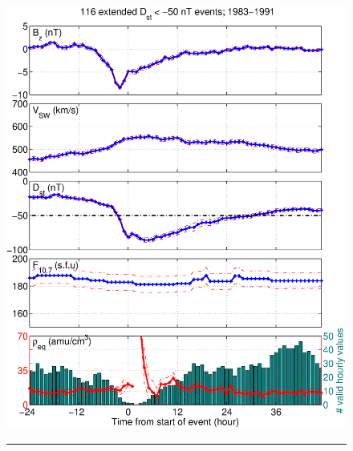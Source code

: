 \documentclass[12pt]{article}
\begin{document}
\begin{figure}[h]
	\end{figure}
	
	\clearpage
	
	\begin{figure}[tp!]
		\centering
		\includegraphics[scale=0.40]{2016SW001507R-p04a.eps}
		\\
		\rule[1ex]{5cm}{1pt}
		\\

\end{figure}
\end{document}
